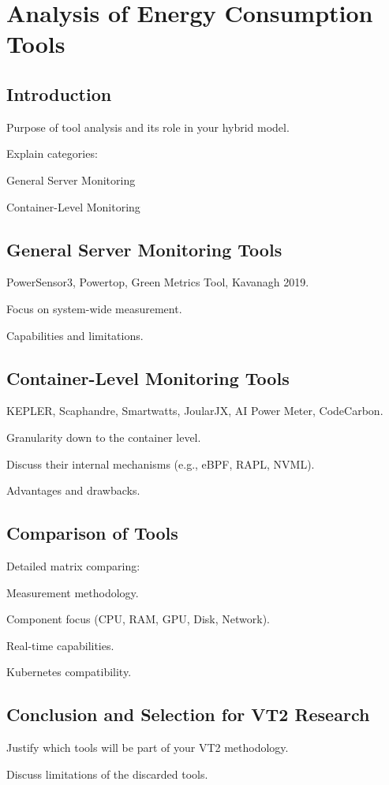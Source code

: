 \chapter{Analysis of Energy Consumption Tools} %
\label{Chapter3}


\section{Introduction}

    Purpose of tool analysis and its role in your hybrid model.

    Explain categories:

        General Server Monitoring

        Container-Level Monitoring

\section{General Server Monitoring Tools}

    PowerSensor3, Powertop, Green Metrics Tool, Kavanagh 2019.

    Focus on system-wide measurement.

    Capabilities and limitations.

\section{Container-Level Monitoring Tools}

    KEPLER, Scaphandre, Smartwatts, JoularJX, AI Power Meter, CodeCarbon.

    Granularity down to the container level.

    Discuss their internal mechanisms (e.g., eBPF, RAPL, NVML).

    Advantages and drawbacks.

\section{Comparison of Tools}

    Detailed matrix comparing:

        Measurement methodology.

        Component focus (CPU, RAM, GPU, Disk, Network).

        Real-time capabilities.

        Kubernetes compatibility.

\section{Conclusion and Selection for VT2 Research}

    Justify which tools will be part of your VT2 methodology.

    Discuss limitations of the discarded tools.